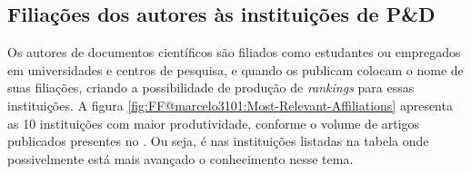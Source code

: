 \begin{table}[htp]
\centering
{}
\caption{10 autores de maior impacto no \dataset\ FF@marcelo3101, conforme número de citações globais}
\label{tab:FF@marcelo3101:Author:ImpactoQtdPublicacoes}
\end{table}

\subsection{Filiações dos autores às instituições de P\&D}

Os autores de documentos científicos são filiados como estudantes ou empregados em universidades e centros de pesquisa, e quando os publicam colocam o nome de suas filiações, criando a possibilidade de produção de \textit{rankings} para essas instituições. A figura \ref{fig:FF@marcelo3101:Most-Relevant-Affiliations} apresenta as 10 instituições com maior produtividade, conforme o volume de artigos publicados presentes no \dataset. Ou seja, é nas instituições listadas na tabela onde possivelmente está mais avançado o conhecimento nesse tema. 


